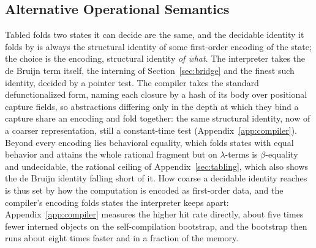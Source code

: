 \subsection{Alternative Operational Semantics}\label{sec:design-space}
\textsf{Tabled} folds two states it can decide are the same, and the decidable identity it folds by is always the structural identity of some first-order encoding of the state; the choice is the encoding, structural identity \emph{of what}. The interpreter takes the de Bruijn term itself, the interning of Section~\ref{sec:bridge} and the finest such identity, decided by a pointer test. The compiler takes the standard defunctionalized form, naming each closure by a hash of its body over positional capture fields, so abstractions differing only in the depth at which they bind a capture share an encoding and fold together: the same structural identity, now of a coarser representation, still a constant-time test (Appendix~\ref{app:compiler}). Beyond every encoding lies behavioral equality, which folds states with equal behavior and attains the whole rational fragment but on $\lambda$-terms is $\beta$-equality and undecidable, the rational ceiling of Appendix~\ref{sec:tabling}, which also shows the de Bruijn identity falling short of it. How coarse a decidable identity reaches is thus set by how the computation is encoded as first-order data, and the compiler's encoding folds states the interpreter keeps apart: Appendix~\ref{app:compiler} measures the higher hit rate directly, about five times fewer interned objects on the self-compilation bootstrap, and the bootstrap then runs about eight times faster and in a fraction of the memory.

